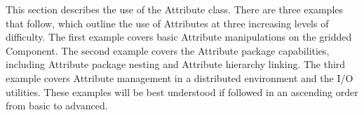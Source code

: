 %


This section describes the use of the Attribute class.  There are three examples that follow, which outline the use of Attributes at three increasing levels of difficulty.  The first example covers basic Attribute manipulations on the gridded Component.  The second example covers the Attribute package capabilities, including Attribute package nesting and Attribute hierarchy linking.  The third example covers Attribute management in a distributed environment and the I/O utilities.  These examples will be best understood if followed in an ascending order from basic to advanced.